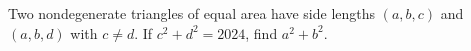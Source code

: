 Two nondegenerate triangles of equal area have side lengths $(a,b,c)$ and $(a,b,d)$ with $c\ne d$. If $c^2+d^2=2024$, find $a^2+b^2$.
